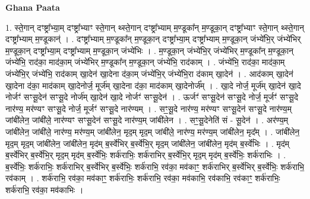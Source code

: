 \documentclass[17pt]{extarticle}
\begin{document}
\textbf{Ghana Paata } \newline

1. स्ते॒गान् दꣳष्ट्रा᳚भ्या॒म् दꣳष्ट्रा᳚भ्याꣳ स्ते॒गान् थ्स्ते॒गान् दꣳष्ट्रा᳚भ्याम् म॒ण्डूका᳚न् म॒ण्डूका॒न् दꣳष्ट्रा᳚भ्याꣳ स्ते॒गान् थ्स्ते॒गान् दꣳष्ट्रा᳚भ्याम् म॒ण्डूकान्॑ । . दꣳष्ट्रा᳚भ्याम् म॒ण्डूका᳚न् म॒ण्डूका॒न् दꣳष्ट्रा᳚भ्या॒म् दꣳष्ट्रा᳚भ्याम् म॒ण्डूका॒न् जंभ्ये॑भि॒र् जंभ्ये॑भिर् म॒ण्डूका॒न् दꣳष्ट्रा᳚भ्या॒म् दꣳष्ट्रा᳚भ्याम् म॒ण्डूका॒न् जंभ्ये॑भिः । . म॒ण्डूका॒न् जंभ्ये॑भि॒र् जंभ्ये॑भिर् म॒ण्डूका᳚न् म॒ण्डूका॒न् जंभ्ये॑भि॒ राद॑का॒ माद॑का॒म् जंभ्ये॑भिर् म॒ण्डूका᳚न् म॒ण्डूका॒न् जंभ्ये॑भि॒ राद॑काम् । . जंभ्ये॑भि॒ राद॑का॒ माद॑का॒म् जंभ्ये॑भि॒र् जंभ्ये॑भि॒ राद॑काम् खा॒देन॑ खा॒देना द॑का॒म् जंभ्ये॑भि॒र् जंभ्ये॑भि॒रा द॑काम् खा॒देन॑ । . आद॑काम् खा॒देन॑ खा॒देना द॑का॒ माद॑काम् खा॒देनोर्ज॒ मूर्ज॑म् खा॒देना द॑का॒ माद॑काम् खा॒देनोर्ज᳚म् । . खा॒दे नोर्ज॒ मूर्ज॑म् खा॒देन॑ खा॒दे नोर्जꣳ॑ सꣳसू॒देन॑ सꣳसू॒दे नोर्ज॑म् खा॒देन॑ खा॒दे नोर्जꣳ॑ सꣳसू॒देन॑ । . ऊर्जꣳ॑ सꣳसू॒देन॑ सꣳसू॒दे नोर्ज॒ मूर्जꣳ॑ सꣳसू॒दे नार॑ण्य॒ मर॑ण्यꣳ सꣳसू॒दे नोर्ज॒ मूर्जꣳ॑ सꣳसू॒दे नार॑ण्यम् । . सꣳ॒॒सू॒दे नार॑ण्य॒ मर॑ण्यꣳ सꣳसू॒देन॑ सꣳसू॒दे नार॑ण्य॒म् जांबी॑लेन॒ जांबी॑ले॒ नार॑ण्यꣳ सꣳसू॒देन॑ सꣳसू॒दे नार॑ण्य॒म् जांबी॑लेन । . सꣳ॒॒सू॒देनेति॑ सं - सू॒देन॑ । . अर॑ण्य॒म् जांबी॑लेन॒ जांबी॑ले॒ नार॑ण्य॒ मर॑ण्य॒म् जांबी॑लेन॒ मृद॒म् मृद॒म् जांबी॑ले॒ नार॑ण्य॒ मर॑ण्य॒म् जांबी॑लेन॒ मृद᳚म् । . जांबी॑लेन॒ मृद॒म् मृद॒म् जांबी॑लेन॒ जांबी॑लेन॒ मृद॑म् ब॒र्स्वे॑भिर् ब॒र्स्वे॑भि॒र् मृद॒म् जांबी॑लेन॒ जांबी॑लेन॒ मृद॑म् ब॒र्स्वे॑भिः । . मृद॑म् ब॒र्स्वे॑भिर् ब॒र्स्वे॑भि॒र् मृद॒म् मृद॑म् ब॒र्स्वे॑भिः॒ शर्क॑राभिः॒ शर्क॑राभिर् ब॒र्स्वे॑भि॒र् मृद॒म् मृद॑म् ब॒र्स्वे॑भिः॒ शर्क॑राभिः । . ब॒र्स्वे॑भिः॒ शर्क॑राभिः॒ शर्क॑राभिर् ब॒र्स्वे॑भिर् ब॒र्स्वे॑भिः॒ शर्क॑राभि॒ रव॑का॒ मव॑काꣳ॒॒ शर्क॑राभिर् ब॒र्स्वे॑भिर् ब॒र्स्वे॑भिः॒ शर्क॑राभि॒ रव॑काम् । . शर्क॑राभि॒ रव॑का॒ मव॑काꣳ॒॒ शर्क॑राभिः॒ शर्क॑राभि॒ रव॑का॒ मव॑काभि॒ रव॑काभि॒ रव॑काꣳ॒॒ शर्क॑राभिः॒ शर्क॑राभि॒ रव॑का॒ मव॑काभिः । \newline
\end{document}
